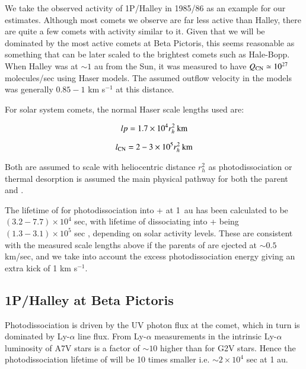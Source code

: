 \documentclass{aa}
\newcommand{\kms}{km s$^{-1}$}
\newcommand{\bp}{Beta Pictoris}
\begin{document}
We take the observed activity of 1P/Halley in 1985/86 as an example for our estimates.
%
Although most comets we observe are far less active than Halley, there are quite a few comets with activity similar to it.
%
Given that we will be dominated by the most active comets at \bp{}, this seems reasonable as something that can be later scaled to the brightest comets such as Hale-Bopp.
%
When Halley was at $\sim 1$ au from the Sun, it was measured to have $Q_{\ce{CN}}\simeq 10^{27}$ molecules/sec using Haser models.
%
The assumed outflow velocity in the models was generally  $0.85 - 1$ \kms{} at this distance.

For solar system comets, the normal Haser scale lengths used \citep{Cochran86,AHearn1995} are:

$$lp=1.7\times10^4r_h^2\:{\rm km}$$

$$l_{\ce{CN}}=2-3\times10^5r_h^2\:{\rm km}$$

Both are assumed to scale with heliocentric distance $r_h^2$ as photodissociation or thermal desorption is assumed the main physical pathway for both the parent and .

The lifetime of  for photodissociation into + at 1~au has been calculated to be $(3.2-7.7)\times10^4$ sec, with lifetime of  dissociating into + being $(1.3-3.1)\times10^5$ sec \citep{Huebner92}, depending on solar activity levels.
%
These are consistent with the measured scale lengths above if the parents of  are ejected at $\sim 0.5$ km/sec, and we take into account the excess photodissociation energy giving  an extra kick of 1 \kms{}. 

\subsection{1P/Halley at \bp{}}


Photodissociation is  driven by the UV photon flux at the comet, which in turn is dominated by Ly-$\alpha$ line flux. From Ly-$\alpha$ measurements in \citet{Landsman93} the intrinsic Ly-$\alpha$ luminosity of A7V stars is a factor of $\sim10$ higher than for G2V stars.
%
Hence the photodissociation lifetime of  will be 10 times smaller i.e. $\sim 2\times10^4$ sec at 1 au.
\end{document}
